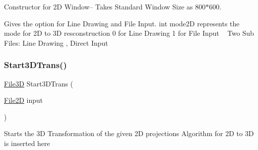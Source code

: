 Constructor for 2D Window-- Takes Standard Window Size as 800$\ast$600.

Gives the option for Line Drawing and File Input. int mode2D represents the mode for 2D to 3D resconstruction 0 for Line Drawing 1 for File Input ~\newline
 Two Sub Files\+: Line Drawing , Direct Input \mbox{\label{group___module_gad99a14e6347dc60d82d1132bbdd5570b}} 
\subsubsection{\texorpdfstring{Start3\+D\+Trans()}{Start3DTrans()}}
{\footnotesize\ttfamily \mbox{\hyperlink{class_file3_d}{File3D}} Start3\+D\+Trans (\begin{DoxyParamCaption}\item[{\mbox{\hyperlink{class_file2_d}{File2D}}}]{input }\end{DoxyParamCaption})}

Starts the 3D Transformation of the given 2D projections Algorithm for 2D to 3D is inserted here 